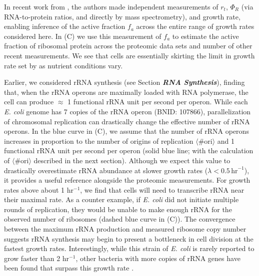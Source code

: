 In recent work from \cite{dai2016}, the authors made independent measurements of
$r_t$, $\Phi_R$ (via RNA-to-protein ratios, and directly by mass spectrometry),
and growth rate, enabling inference of the active fraction $f_a$ across the
entire range of growth rates considered here. In (C) we use
this measurement of $f_a$ to estimate the active fraction of ribosomal protein
across the proteomic data sets and number of other recent measurements. We see
that cells are essentially skirting the limit in growth rate set by
 as nutrient conditions vary.

Earlier, we considered rRNA synthesis (see Section \textit{\bf RNA Synthesis}),
finding that, when the rRNA operons are maximally loaded with RNA polymerase,
the cell can produce $\approx$ 1 functional rRNA unit per second per operon.
While each \textit{E. coli} genome has 7 copies of the rRNA operon (BNID:
107866), parallelization of chromosomal replication can drastically change the
effective  number of rRNA operons. In the blue curve in (C),
we assume that the number of rRNA operons increases in proportion to the number
of origins of replication $\langle\text{\# ori}\rangle$ and 1 functional rRNA
unit per second per operon (solid blue line; with the calculation of
$\langle\text{\# ori}\rangle$ described in the next section). Although we expect
this value to drastically overestimate rRNA abundance at slower growth rates
($\lambda < 0.5\, \text{hr}^{-1}$), it provides a useful reference alongside the
proteomic measurements. For growth rates above about 1 hr$^{-1}$, we find that
cells will need to transcribe rRNA near their maximal rate. As a counter
example, if \textit{E. coli} did not initiate multiple rounds of replication,
they would be unable to make enough rRNA for the observed number of ribosomes
(dashed blue curve in (C)).  The convergence between the
maximum rRNA production and measured ribosome copy number suggests rRNA
synthesis may begin to present a bottleneck in cell division at the fastest
growth rates. Interestingly, while this strain of \textit{E. coli} is rarely
reported to grow faster than 2 hr$^{-1}$, other bacteria with more copies of
rRNA genes have been found that surpass this growth rate
\citep{bremer2008,roller2016}.

